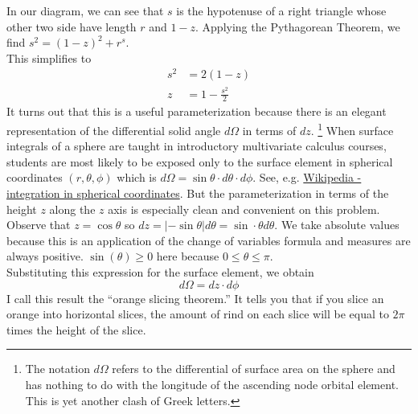 In our diagram, we can see that $s$ is the hypotenuse of a right triangle whose other two side have length $r$ and $1-z$.
Applying the Pythagorean Theorem, we find $s^2 = (1-z)^2 + r^s$.\\
This simplifies to
\begin{align*}
s^2 &= 2(1-z) \\
z &= 1 - \frac{s^2}{2}
\end{align*}
It turns out that this is a useful parameterization because there is an elegant representation
of the differential solid angle $d\Omega$ in terms of $dz$.
\footnote{The notation $d\Omega$ refers to the differential of surface area on the sphere 
and has nothing to do with the longitude of the ascending node orbital element.
This is yet another clash of Greek letters.}
When surface integrals of a sphere are taught in introductory multivariate calculus courses, 
students are most likely to be exposed only to the surface element in spherical coordinates $(r, \theta, \phi)$ which is
$d\Omega = \sin \theta \cdot d\theta \cdot d\phi$.
See, e.g. \href{https://en.wikipedia.org/wiki/Spherical_coordinate_system}{Wikipedia - integration in spherical coordinates}.
But the parameterization in terms of the height $z$ along the $z$ axis is especially clean and convenient on this problem.\\
Observe that $z = \cos \theta$ so $dz = |- \sin \theta| d\theta = \sin \cdot \theta d\theta$.  
We take absolute values because this is an application of the change of variables formula and measures are always positive. 
$\sin(\theta) \ge 0 $ here because $0 \le \theta \le \pi$.\\
Substituting this expression for the surface element, we obtain
$$ d\Omega = dz \cdot d\phi$$
I call this result the ``orange slicing theorem.''
It tells you that if you slice an orange into horizontal slices, the amount of rind on each slice will be equal to $2 \pi$ times the height of the slice.

